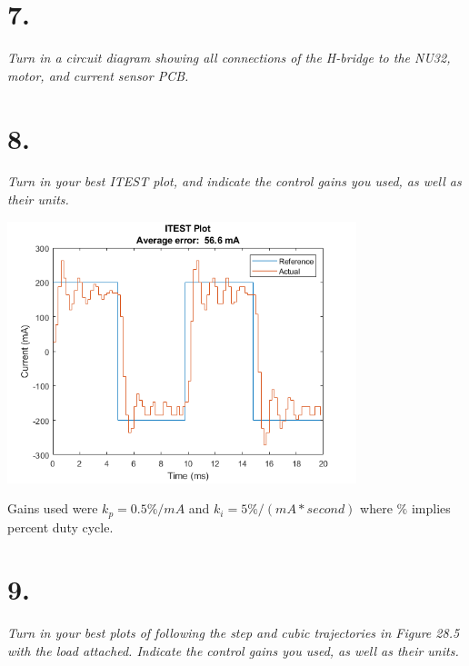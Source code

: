 \documentclass[12pt]{article}
\begin{document}
\section*{7.}
\textit{Turn in a circuit diagram showing all connections of the H-bridge to the NU32, motor, and current sensor PCB.}

\section*{8.}
\textit{Turn in your best ITEST plot, and indicate the control gains you used, as well as their units.}

\begin{center}
    \includegraphics[width=4in]{ITEST_kp0.5_ki5.png}
\end{center}

Gains used were $k_p = 0.5 \%/mA$ and $k_i = 5 \%/(mA*second)$ where $\%$ implies percent duty cycle.

\section*{9.}
\textit{Turn in your best plots of following the step and cubic trajectories in Figure 28.5 with the load attached. Indicate the control gains you used, as well as their units.}
\end{document}
